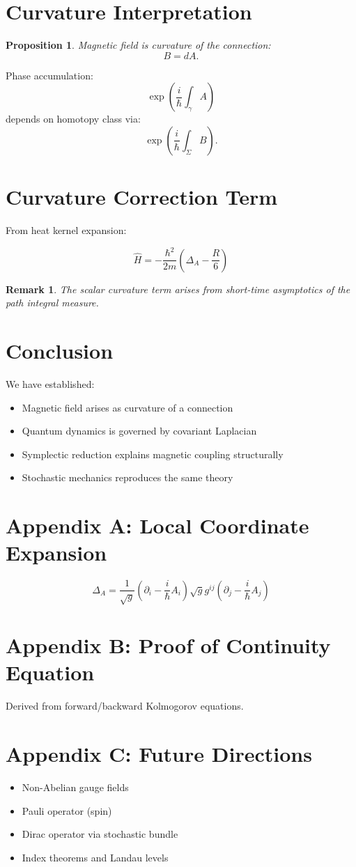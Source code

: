 \documentclass[11pt]{article}
\newtheorem{proposition}[theorem]{Proposition}
\newtheorem{remark}[theorem]{Remark}
\begin{document}
\section{Curvature Interpretation}

\begin{proposition}
Magnetic field is curvature of the connection:
\[
B = dA.
\]
\end{proposition}

Phase accumulation:
\[
\exp\left(\frac{i}{\hbar}\int_\gamma A\right)
\]
depends on homotopy class via:
\[
\exp\left(\frac{i}{\hbar}\int_\Sigma B\right).
\]

\section{Curvature Correction Term}

From heat kernel expansion:

\[
\hat{H} = -\frac{\hbar^2}{2m}(\Delta_A - \frac{R}{6})
\]

\begin{remark}
The scalar curvature term arises from short-time asymptotics of the path integral measure.
\end{remark}

\section{Conclusion}

We have established:

\begin{itemize}
\item Magnetic field arises as curvature of a connection
\item Quantum dynamics is governed by covariant Laplacian
\item Symplectic reduction explains magnetic coupling structurally
\item Stochastic mechanics reproduces the same theory
\end{itemize}

\section*{Appendix A: Local Coordinate Expansion}

\[
\Delta_A =
\frac{1}{\sqrt{g}}(\partial_i - \frac{i}{\hbar}A_i)\sqrt{g}g^{ij}(\partial_j - \frac{i}{\hbar}A_j)
\]

\section*{Appendix B: Proof of Continuity Equation}

Derived from forward/backward Kolmogorov equations.

\section*{Appendix C: Future Directions}

\begin{itemize}
\item Non-Abelian gauge fields
\item Pauli operator (spin)
\item Dirac operator via stochastic bundle
\item Index theorems and Landau levels
\end{itemize}
\end{document}
